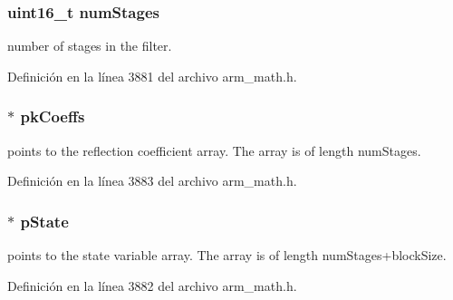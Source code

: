 \subsubsection[{\texorpdfstring{num\+Stages}{numStages}}]{\setlength{\rightskip}{0pt plus 5cm}uint16\+\_\+t num\+Stages}\hypertarget{structarm__iir__lattice__instance__f32_a4cceb90547b3e585d4c7aabaa8057212}{}\label{structarm__iir__lattice__instance__f32_a4cceb90547b3e585d4c7aabaa8057212}
number of stages in the filter. 

Definición en la línea 3881 del archivo arm\+\_\+math.\+h.

\subsubsection[{\texorpdfstring{pk\+Coeffs}{pkCoeffs}}]{$\ast$ pk\+Coeffs}\hypertarget{structarm__iir__lattice__instance__f32_a994889c5c4a866c50a0ee63326378816}{}\label{structarm__iir__lattice__instance__f32_a994889c5c4a866c50a0ee63326378816}
points to the reflection coefficient array. The array is of length num\+Stages. 

Definición en la línea 3883 del archivo arm\+\_\+math.\+h.

\subsubsection[{\texorpdfstring{p\+State}{pState}}]{$\ast$ p\+State}\hypertarget{structarm__iir__lattice__instance__f32_a335c87e6fdc4b96601d95a5de8b9c463}{}\label{structarm__iir__lattice__instance__f32_a335c87e6fdc4b96601d95a5de8b9c463}
points to the state variable array. The array is of length num\+Stages+block\+Size. 

Definición en la línea 3882 del archivo arm\+\_\+math.\+h.

